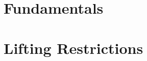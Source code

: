 \documentclass[11pt]{book}
\begin{document}
\setlength\emergencystretch{\hsize}



\thispagestyle{empty}

\thispagestyle{empty}



\tableofcontents


\mainmatter




\part{Fundamentals}







\part{Lifting Restrictions}




\end{document}
